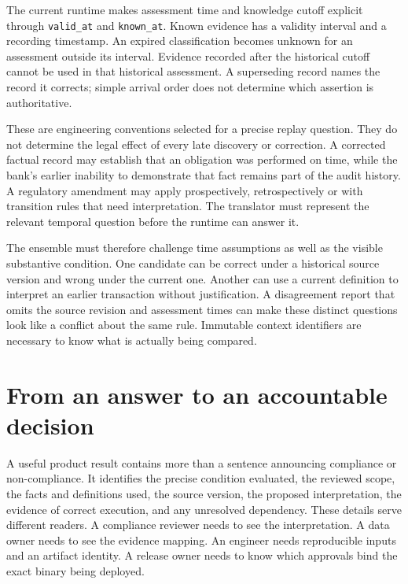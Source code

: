 \documentclass[12pt,a4paper,oneside,openany]{book}
\begin{document}
The current runtime makes assessment time and knowledge cutoff explicit through
\texttt{valid\_at} and \texttt{known\_at}. Known evidence has a validity interval
and a recording timestamp. An expired classification becomes unknown for an
assessment outside its interval. Evidence recorded after the historical cutoff
cannot be used in that historical assessment. A superseding record names the
record it corrects; simple arrival order does not determine which assertion is
authoritative.

These are engineering conventions selected for a precise replay question. They
do not determine the legal effect of every late discovery or correction. A
corrected factual record may establish that an obligation was performed on time,
while the bank's earlier inability to demonstrate that fact remains part of the
audit history. A regulatory amendment may apply prospectively, retrospectively or
with transition rules that need interpretation. The translator must represent
the relevant temporal question before the runtime can answer it.

The ensemble must therefore challenge time assumptions as well as the visible
substantive condition. One candidate can be correct under a historical source
version and wrong under the current one. Another can use a current definition
to interpret an earlier transaction without justification. A disagreement report
that omits the source revision and assessment times can make these distinct
questions look like a conflict about the same rule. Immutable context identifiers
are necessary to know what is actually being compared.

\section{From an answer to an accountable decision}
\label{merge:M01:07}

\label{sec:problem-accountability}
A useful product result contains more than a sentence announcing compliance or
non-compliance. It identifies the precise condition evaluated, the reviewed scope,
the facts and definitions used, the source version, the proposed interpretation,
the evidence of correct execution, and any unresolved dependency. These details
serve different readers. A compliance reviewer needs to see the interpretation.
A data owner needs to see the evidence mapping. An engineer needs reproducible
inputs and an artifact identity. A release owner needs to know which approvals
bind the exact binary being deployed.
\end{document}
